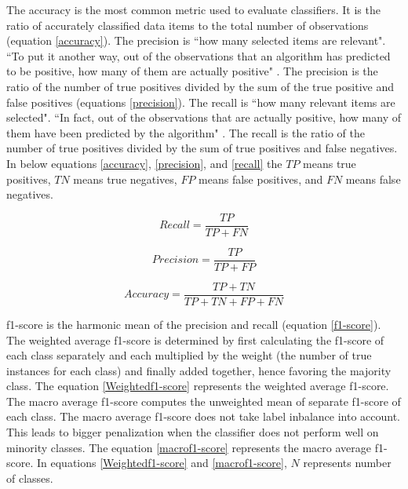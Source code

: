 The accuracy is the most common metric used to evaluate classifiers. It is the ratio of accurately classified data items to the total number of observations (equation \ref{accuracy}). The precision is ``how many selected items are relevant". ``To put it another way, out of the observations that an algorithm has predicted to be positive, how many of them are actually positive" \cite{vakili2020performance}. The precision is the ratio of the number of true positives divided by the sum of the true positive and false positives (equations \ref{precision}). The recall is ``how many relevant items are selected". ``In fact, out of the observations that are actually positive, how many of them have been predicted by the algorithm" \cite{vakili2020performance}. The recall is the ratio of the number of true positives divided by the sum of true positives and false negatives. In below equations \ref{accuracy}, \ref{precision}, and \ref{recall} the $TP$ means true positives, $TN$ means true negatives, $FP$ means false positives, and $FN$ means false negatives.



\begin{equation}\label{recall}
\textit{Recall} = \frac{TP}{TP + FN}
\end{equation}

\begin{equation}\label{precision}
\textit{Precision} = \frac{TP}{TP + FP}
\end{equation}


\begin{equation}\label{accuracy}
\textit{Accuracy} = \frac{TP + TN}{TP +TN+ FP + FN}
\end{equation}

f1-score is the harmonic mean of the precision and recall (equation \ref{f1-score}). The weighted average f1-score is determined by first calculating the f1-score of each class separately and each multiplied by the weight (the number of true instances for each class) and finally added together, hence favoring the majority class. The equation \ref{Weightedf1-score} represents the weighted average f1-score. The macro average f1-score computes the unweighted mean of separate f1-score of each class. The macro average f1-score does not take label inbalance into account. This leads to bigger penalization when the classifier does not perform well on minority classes. The equation \ref{macrof1-score} represents the macro average f1-score. In equations \ref{Weightedf1-score} and \ref{macrof1-score}, $N$ represents number of classes.

